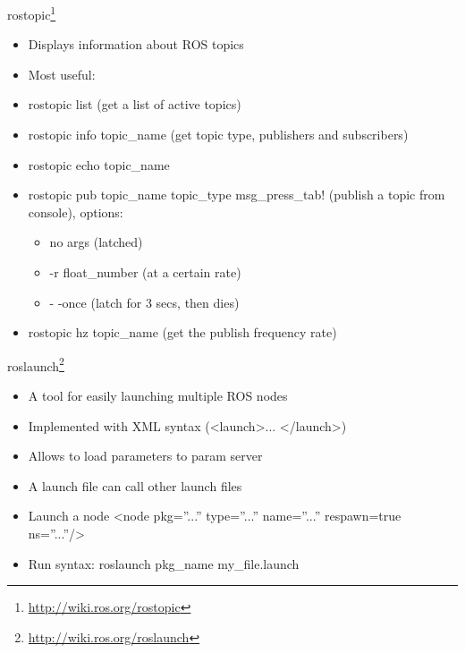 \documentclass{beamer}
\begin{document}
\begin{frame}{rostopic\footnote{\url{http://wiki.ros.org/rostopic}}}

	\begin{itemize}
		\item Displays information about ROS topics
		\item Most useful:
		\item rostopic list (get a list of active topics)
		\item rostopic info topic\_name (get topic type, publishers and subscribers)
		\item rostopic echo topic\_name
		\item rostopic pub topic\_name topic\_type msg\_press\_tab! (publish a topic from console), options:
		\begin{itemize}
			\item no args (latched)
			\item -r float\_number (at a certain rate)
			\item - -once (latch for 3 secs, then dies)
		\end{itemize}
		\item rostopic hz topic\_name (get the publish frequency rate)
	\end{itemize}

\end{frame}


\begin{frame}{roslaunch\footnote{\url{http://wiki.ros.org/roslaunch}}}
	
	\begin{itemize}
		\item A tool for easily launching multiple ROS nodes
		\item Implemented with XML syntax (\textless launch\textgreater ... \textless /launch\textgreater)
		\item Allows to load parameters to param server
		\item A launch file can call other launch files
		\item Launch a node \textless node pkg=”...” type=”...” name=”...” respawn=true ns=”...”/\textgreater
		\item Run syntax: roslaunch pkg\_name my\_file.launch
	\end{itemize}
	
\end{frame}

\end{document}

